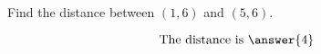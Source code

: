 \documentclass{ximera}
\author{Bart Snapp}
\begin{document}
\begin{exercise}
  Find the distance between $(1,6)$ and $(5,6)$.
  \begin{prompt}
  \[
  \text{The distance is }\answer{4}
  \]
  \end{prompt}
\end{exercise}
\end{document}
